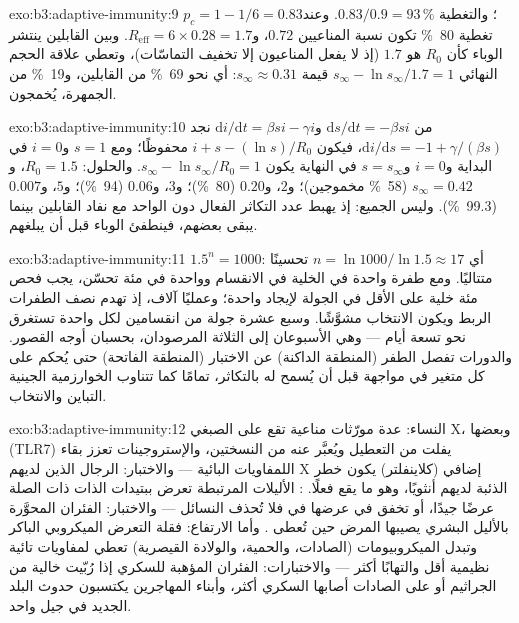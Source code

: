 \begin{solution}{exo:b3:adaptive-immunity:9}
$p_{c} = 1 - 1/6 = 0.83$؛ والتغطية $0.83/0.9 = 93\,\%$. وعند
تغطية \qty{80}{\%} تكون نسبة المناعيين $0.72$، و$R_{\text{eff}} = 6\times 0.28
= 1.7$. وبين القابلين ينتشر الوباء كأن $R_{0}$ هو
$1.7$ (إذ لا يفعل المناعيون إلا تخفيف التماسّات)، وتعطي
علاقة الحجم النهائي $s_{\infty} - \ln s_{\infty}/1.7 = 1$ قيمة $s_{\infty}
\approx 0.31$: أي نحو \qty{69}{\%} من القابلين، و\qty{19}{\%} من
الجمهرة، يُخمجون.
\end{solution}

\begin{solution}{exo:b3:adaptive-immunity:10}
من $\mathrm{d}s/\mathrm{d}t = -\beta si$ و$\mathrm{d}i/\mathrm{d}t
= \beta si - \gamma i$ نجد $\mathrm{d}i/\mathrm{d}s = -1 + \gamma/(\beta s)$،
فيكون $i + s - (\ln s)/R_{0}$ محفوظًا؛ ومع $s = 1$ و$i = 0$ في
البداية و$i = 0$ و$s = s_{\infty}$ في النهاية يكون $s_{\infty} - \ln
s_{\infty}/R_{0} = 1$. والحلول: $R_{0} = 1.5$، و$s_{\infty} = 0.42$
(\qty{58}{\%} مخموجين)؛ و$2$، و$0.20$ (\qty{80}{\%})؛ و$3$، و$0.06$
(\qty{94}{\%})؛ و$5$، و$0.007$ (\qty{99.3}{\%}). وليس الجميع: إذ
يهبط عدد التكاثر الفعال دون الواحد مع نفاد القابلين بينما
يبقى بعضهم، فينطفئ الوباء قبل أن يبلغهم.
\end{solution}

\begin{solution}{exo:b3:adaptive-immunity:11}
$1.5^{n} = 1000$: أي $n = \ln 1000/\ln 1.5 \approx 17$ تحسينًا
متتاليًا. ومع طفرة واحدة في الخلية في الانقسام وواحدة في
مئة تحسّن، يجب فحص مئة خلية على الأقل في الجولة لإيجاد
واحدة؛ وعمليًا آلاف، إذ تهدم نصف الطفرات الربط ويكون
الانتخاب مشوَّشًا. وسبع عشرة جولة من انقسامين لكل واحدة
تستغرق نحو تسعة أيام --- وهي الأسبوعان إلى الثلاثة
المرصودان، بحسبان أوجه القصور. والدورات تفصل الطفر (المنطقة
الداكنة) عن الاختبار (المنطقة الفاتحة) حتى يُحكم على كل
متغير في مواجهة  قبل أن يُسمح له بالتكاثر، تمامًا
كما تتناوب الخوارزمية الجينية التباين والانتخاب.
\end{solution}

\begin{solution}{exo:b3:adaptive-immunity:12}
النساء: عدة مورّثات مناعية تقع على الصبغي X، وبعضها (TLR7)
يفلت من التعطيل ويُعبَّر عنه من النسختين، والإستروجينات
تعزز بقاء اللمفاويات البائية --- والاختبار: الرجال الذين
لديهم X إضافي (كلاينفلتر) يكون خطر الذئبة لديهم أنثويًا،
وهو ما يقع فعلًا. : الأليلات المرتبطة تعرض ببتيدات
الذات ذات الصلة عرضًا جيدًا، أو تخفق في عرضها في 
فلا تُحذف النسائل --- والاختبار: الفئران المحوَّرة بالأليل
البشري يصيبها المرض حين تُعطى . وأما الارتفاع: فقلة
التعرض الميكروبي الباكر وتبدل الميكروبيومات (الصادات،
والحمية، والولادة القيصرية) تعطي لمفاويات تائية نظيمية أقل
والتهابًا أكثر --- والاختبارات: الفئران المؤهبة للسكري إذا
رُبّيت خالية من الجراثيم أو على الصادات أصابها السكري أكثر،
وأبناء المهاجرين يكتسبون حدوث البلد الجديد في جيل واحد.
\end{solution}

